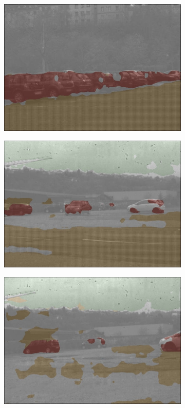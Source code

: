 \begin{figure}[h]
\begin{subfigure}[b]{0.18\linewidth}
		\includegraphics[width=\linewidth]{Figures/Aug/CA2/selected_images/overlayed/over4981.jpg}
	\end{subfigure}
	\begin{subfigure}[b]{0.18\linewidth}   
		\centering 
		\includegraphics[width=\linewidth]{Figures/Aug/CA2/selected_images/overlayed/over5142.jpg}
	\end{subfigure}
	\begin{subfigure}[b]{0.18\linewidth}   
		\centering 
		\includegraphics[width=\linewidth]{Figures/Aug/CA2/selected_images/overlayed/over5426.jpg}

\end{subfigure}
\end{figure}
